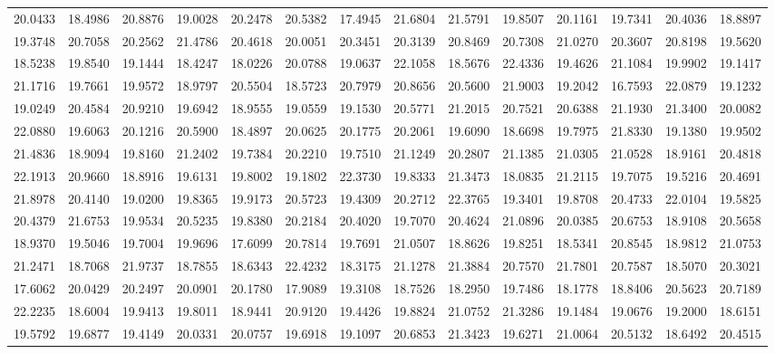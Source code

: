 \documentclass[12pt]{article}\usepackage[]{graphicx}\usepackage[]{color}
\begin{document}
\begin{landscape}
\begin{longtable}[t]{rrrrrrrrrrrrrr}
20.0433 & 18.4986 & 20.8876 & 19.0028 & 20.2478 & 20.5382 & 17.4945 & 21.6804 & 21.5791 & 19.8507 & 20.1161 & 19.7341 & 20.4036 & 18.8897\\
19.3748 & 20.7058 & 20.2562 & 21.4786 & 20.4618 & 20.0051 & 20.3451 & 20.3139 & 20.8469 & 20.7308 & 21.0270 & 20.3607 & 20.8198 & 19.5620\\
18.5238 & 19.8540 & 19.1444 & 18.4247 & 18.0226 & 20.0788 & 19.0637 & 22.1058 & 18.5676 & 22.4336 & 19.4626 & 21.1084 & 19.9902 & 19.1417\\
21.1716 & 19.7661 & 19.9572 & 18.9797 & 20.5504 & 18.5723 & 20.7979 & 20.8656 & 20.5600 & 21.9003 & 19.2042 & 16.7593 & 22.0879 & 19.1232\\
19.0249 & 20.4584 & 20.9210 & 19.6942 & 18.9555 & 19.0559 & 19.1530 & 20.5771 & 21.2015 & 20.7521 & 20.6388 & 21.1930 & 21.3400 & 20.0082\\
22.0880 & 19.6063 & 20.1216 & 20.5900 & 18.4897 & 20.0625 & 20.1775 & 20.2061 & 19.6090 & 18.6698 & 19.7975 & 21.8330 & 19.1380 & 19.9502\\
21.4836 & 18.9094 & 19.8160 & 21.2402 & 19.7384 & 20.2210 & 19.7510 & 21.1249 & 20.2807 & 21.1385 & 21.0305 & 21.0528 & 18.9161 & 20.4818\\
22.1913 & 20.9660 & 18.8916 & 19.6131 & 19.8002 & 19.1802 & 22.3730 & 19.8333 & 21.3473 & 18.0835 & 21.2115 & 19.7075 & 19.5216 & 20.4691\\
21.8978 & 20.4140 & 19.0200 & 19.8365 & 19.9173 & 20.5723 & 19.4309 & 20.2712 & 22.3765 & 19.3401 & 19.8708 & 20.4733 & 22.0104 & 19.5825\\
20.4379 & 21.6753 & 19.9534 & 20.5235 & 19.8380 & 20.2184 & 20.4020 & 19.7070 & 20.4624 & 21.0896 & 20.0385 & 20.6753 & 18.9108 & 20.5658\\
18.9370 & 19.5046 & 19.7004 & 19.9696 & 17.6099 & 20.7814 & 19.7691 & 21.0507 & 18.8626 & 19.8251 & 18.5341 & 20.8545 & 18.9812 & 21.0753\\
21.2471 & 18.7068 & 21.9737 & 18.7855 & 18.6343 & 22.4232 & 18.3175 & 21.1278 & 21.3884 & 20.7570 & 21.7801 & 20.7587 & 18.5070 & 20.3021\\
17.6062 & 20.0429 & 20.2497 & 20.0901 & 20.1780 & 17.9089 & 19.3108 & 18.7526 & 18.2950 & 19.7486 & 18.1778 & 18.8406 & 20.5623 & 20.7189\\
22.2235 & 18.6004 & 19.9413 & 19.8011 & 18.9441 & 20.9120 & 19.4426 & 19.8824 & 21.0752 & 21.3286 & 19.1484 & 19.0676 & 19.2000 & 18.6151\\
19.5792 & 19.6877 & 19.4149 & 20.0331 & 20.0757 & 19.6918 & 19.1097 & 20.6853 & 21.3423 & 19.6271 & 21.0064 & 20.5132 & 18.6492 & 20.4515\\

\end{longtable}
\end{landscape}
\end{document}
